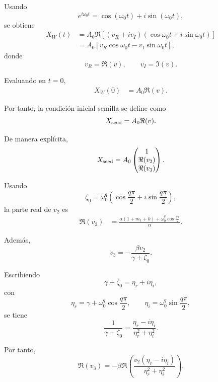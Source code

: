 \documentclass[journal]{IEEEtran}
\begin{document}
Usando
\begin{equation}
e^{i\omega_0 t}
=
\cos(\omega_0 t)
+
i\sin(\omega_0 t),
\end{equation}
se obtiene
\begin{align}
X_W(t)
&=
A_0
\Re
\left[
\left(
v_R+i v_I
\right)
\left(
\cos\omega_0 t+i\sin\omega_0 t
\right)
\right]
\\
&=
A_0
\left[
v_R\cos\omega_0 t
-
v_I\sin\omega_0 t
\right],
\end{align}
donde
\[
v_R=\Re(v),
\qquad
v_I=\Im(v).
\]

Evaluando en \(t=0\),
\begin{align}
X_W(0)
&=
A_0
\Re(v).
\end{align}

Por tanto, la condición inicial semilla se define como
\begin{equation}
\label{eq:Xseed_appendix}
X_{\rm seed}
=
A_0
\Re(v).
\end{equation}

De manera explícita,
\begin{equation}
\label{eq:Xseed_explicit_appendix}
X_{\rm seed}
=
A_0
\begin{pmatrix}
1\\
\Re(v_2)\\
\Re(v_3)
\end{pmatrix}.
\end{equation}

Usando
\[
\zeta_0
=
\omega_0^q
\left(
\cos\frac{q\pi}{2}
+
i\sin\frac{q\pi}{2}
\right),
\]
la parte real de \(v_2\) es
\begin{align}
\Re(v_2)
&=
\frac{
\alpha(1+m_1+k)
+
\omega_0^q\cos\frac{q\pi}{2}
}{\alpha}.
\end{align}

Además,
\begin{equation}
\label{eq:v3_complex_appendix}
v_3
=
-
\frac{\beta v_2}{\gamma+\zeta_0}.
\end{equation}

Escribiendo
\[
\gamma+\zeta_0
=
\eta_r+i\eta_i,
\]
con
\begin{equation}
\eta_r
=
\gamma+\omega_0^q\cos\frac{q\pi}{2},
\qquad
\eta_i
=
\omega_0^q\sin\frac{q\pi}{2},
\end{equation}
se tiene
\begin{equation}
\frac{1}{\gamma+\zeta_0}
=
\frac{\eta_r-i\eta_i}{\eta_r^2+\eta_i^2}.
\end{equation}

Por tanto,
\begin{equation}
\label{eq:v3_real_formula_appendix}
\Re(v_3)
=
-
\beta
\Re
\left(
\frac{v_2(\eta_r-i\eta_i)}{\eta_r^2+\eta_i^2}
\right).
\end{equation}
\end{document}

